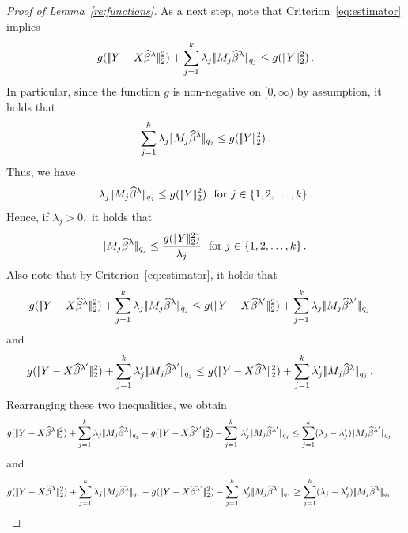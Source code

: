 \documentclass[bj]{imsart}
\newcommand{\normtwo}[1]{\ensuremath{\!|\!| #1 | \! |_{2}}}
\newcommand{\normqj}[1]{\ensuremath{\!|\!| #1 | \! |_{q_j}}}
\newcommand{\1}{{\rm 1}\mskip -4,5mu{\rm l} }
\begin{document}
\begin{proof}[Proof of Lemma~\ref{re:functions}]
As a next step,  note that Criterion~\eqref{eq:estimator} implies
\begin{equation*}
  g(\,\normtwo{\outcome-\design\estimatort}^2)+\sum_{j=1}^{\numbergroups}\lambda_j\,\normqj{\fusedmatrix_j\estimatort} \leq   g(\,\normtwo{\outcome}^2)\,.
\end{equation*}
In particular, since the function $g$ is non-negative on $[0,\infty)$ by assumption, it holds that
\begin{equation*}
 \sum_{j=1}^{\numbergroups}\lambda_j\,\normqj{\fusedmatrix_j\estimatort} \leq   g(\,\normtwo{\outcome}^2)\,.
\end{equation*}
Thus, we have 
\begin{equation*}
 \lambda_j\,\normqj{\fusedmatrix_j\estimatort} \leq   g(\,\normtwo{\outcome}^2) \text{~~for $j\in\{1,2,\dots,\numbergroups\}$} \,.
\end{equation*}
Hence, if $\lambda_j>0,$ it holds that
\begin{equation}
\label{eq:continuous1}
\normqj{\fusedmatrix_j\estimatort} \le \frac{g(\,\normtwo{\outcome}^2)}{\lambda_j }\text{~~for $j\in\{1,2,\dots,\numbergroups\}$} \,.
\end{equation}
Also note that by Criterion~\eqref{eq:estimator}, it holds that
\begin{align*}
g(\,\normtwo{\outcome-\design\estimatort}^2)+\sum_{j=1}^{\numbergroups}\lambda_j\,\normqj{\fusedmatrix_j\estimatort}&\le g(\,\normtwo{\outcome-\design\estimatortprime}^2)+\sum_{j=1}^{\numbergroups}\lambda_j\,\normqj{\fusedmatrix_j\estimatortprime}
\end{align*}
and
\begin{align*}
g(\,\normtwo{\outcome-\design\estimatortprime}^2)+\sum_{j=1}^{\numbergroups}\lambda'_j\,\normqj{\fusedmatrix_j\estimatortprime}&\le g(\,\normtwo{\outcome-\design\estimatort}^2)+\sum_{j=1}^{\numbergroups}\lambda'_j\,\normqj{\fusedmatrix_j\estimatort}\,.
\end{align*}
Rearranging these two inequalities, we obtain
\begin{align*}
g(\,\normtwo{\outcome-\design\estimatort}^2)+\sum_{j=1}^{\numbergroups}\lambda_j\,\normqj{\fusedmatrix_j\estimatort}-g(\,\normtwo{\outcome-\design\estimatortprime}^2)-\sum_{j=1}^{\numbergroups}\,\lambda'_j\,\normqj{\fusedmatrix_j\estimatortprime} &\le \sum_{j=1}^{\numbergroups}(\lambda_j-\lambda'_j)\,\normqj{\fusedmatrix_j\estimatortprime}\
\end{align*}
and
\begin{align*}
g(\,\normtwo{\outcome-\design\estimatort}^2)+\sum_{j=1}^{\numbergroups}\lambda_j\,\normqj{\fusedmatrix_j\estimatort}-g(\,\normtwo{\outcome-\design\estimatortprime}^2)-\sum_{j=1}^{\numbergroups}\,\lambda'_j\,\normqj{\fusedmatrix_j\estimatortprime} &\ge \sum_{j=1}^{\numbergroups}(\lambda_j-\lambda'_j)\,\normqj{\fusedmatrix_j\estimatort}\,.

\end{align*}
\end{proof}
\end{document}
